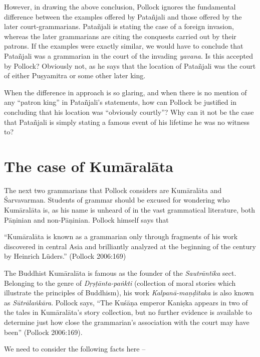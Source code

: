 However, in drawing the above conclusion, Pollock ignores the fundamental difference between the examples offered by Patañjali and those offered by the later court-grammarians. Patañjali is stating the case of a foreign invasion, whereas the later grammarians are citing the conquests carried out by their patrons. If the examples were exactly similar, we would have to conclude that Patañjali was a grammarian in the court of the invading {\sl yavana}. Is this accepted by Pollock? Obviously not, as he says that the location of Patañjali was the court of either Puṣyamitra or some other later king.

When the difference in approach is so glaring, and when there is no mention of any ``patron king'' in Patañjali's statements, how can Pollock be justified in concluding that his location was ``obviously courtly''? Why can it not be the case that Patañjali is simply stating a famous event of his lifetime he was no witness to?

\section{The case of Kumāralāta}\label{chap3-sec10}

The next two grammarians that Pollock considers are Kumāralāta and Śarvavarman. Students of grammar should be excused for wondering who Kumāralāta is, as his name is unheard of in the vast grammatical literature, both Pāṇinian and non-Pāṇinian. Pollock himself says that 
\begin{myquote}
``Kumāralāta is known as a grammarian only through fragments of his work discovered in central Asia and brilliantly analyzed at the beginning of the century by Heinrich Lüders.''
\hfill (Pollock 2006:169)
\end{myquote}

The Buddhist Kumāralāta is famous as the founder of the {\sl Sautrāntika} sect. Belonging to the genre of {\sl Dṛṣṭānta-paṅkti} (collection of moral stories which illustrate the principles of Buddhism), his work {\sl Kalpanā-maṇḍitaka} is also known as {\sl Sūtrālaṅkāra}. Pollock says, ``The Kuśāṇa emperor Kaniṣka appears in two of the tales in Kumāralāta's story collection, but no further evidence is available to determine just how close the grammarian's association with the court may have been'' (Pollock 2006:169).

We need to consider the following facts here --

